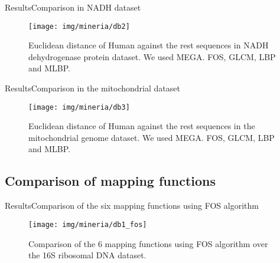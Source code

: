 \documentclass[10pt]{beamer}
\newcommand{\1}{
	\setbeamertemplate{background}{
		\texttt{[image: img/1]}
		\tikz[overlay] \fill[fill opacity=0.75,fill=white] (0,0) rectangle (-\paperwidth,\paperheight);
	}
}
\begin{document}
\begin{frame}{Results}{Comparison in NADH  dataset}
	\begin{figure}[hbt!]
		\centering
		\texttt{[image: img/mineria/db2]}
		\caption{Euclidean distance of Human against the rest sequences in NADH dehydrogenase protein dataset. We used MEGA. FOS, GLCM, LBP and MLBP.}
		\label{img:comp2}
	\end{figure}
\end{frame}

\begin{frame}{Results}{Comparison in the mitochondrial dataset}
\begin{figure}[hbt!]
	\centering
	\texttt{[image: img/mineria/db3]}
	\caption{Euclidean distance of Human against the rest sequences in the mitochondrial genome dataset. We used MEGA. FOS, GLCM, LBP and MLBP.}
	\label{img:comp3}
\end{figure}
\end{frame}

\subsection{Comparison of mapping functions}


\begin{frame}{Results}{Comparison of the six mapping functions using FOS algorithm}
	\begin{figure}[]
		\centering
		\texttt{[image: img/mineria/db1\_fos]}
		\caption{Comparison of the 6 mapping functions using FOS algorithm over the 16S ribosomal DNA dataset.}
		\label{img:comp3}
	\end{figure}
\end{frame}
\end{document}
